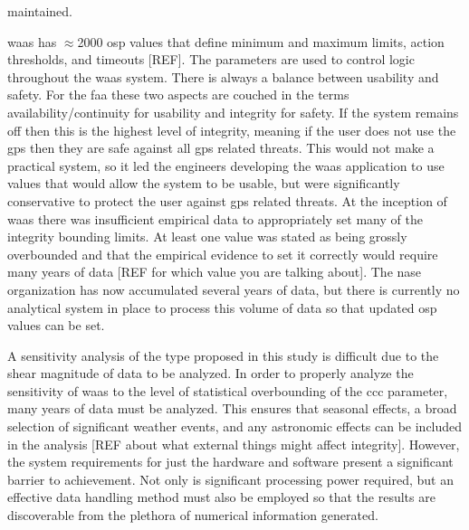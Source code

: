 maintained. %

\ac{waas} has $\approx$2000 \ac{osp} values that define minimum and maximum limits, action thresholds, and timeouts [REF]. The parameters are used to control logic throughout the \ac{waas} system. There is always a balance between usability and safety.  For the \ac{faa} these two aspects are couched in the terms availability/continuity for usability and integrity for safety.  If the system remains off then this is the highest level of integrity, meaning if the user does not use the \ac{gps} then they are safe against all \ac{gps} related threats.  This would not make a practical system, so it led the engineers developing the \ac{waas} application to use values that would allow the system to be usable, but were significantly conservative to protect the user against \ac{gps} related threats.  At the inception of \ac{waas} there was insufficient empirical data to appropriately set many of the integrity bounding limits.  At least one value was stated as being grossly overbounded and that the empirical evidence to set it correctly would require many years of data [REF for which value you are talking about].  The \ac{nase} organization has now accumulated several years of data, but there is currently no analytical system in place to process this volume of data so that updated \ac{osp} values can be set.

A sensitivity analysis of the type proposed in this study is difficult due to the shear magnitude of data to be analyzed. In order to properly analyze the sensitivity of \ac{waas} to the level of statistical overbounding of the \ac{ccc} parameter, many years of data must be analyzed.  This ensures that seasonal effects, a broad selection of significant weather events, and any astronomic effects can be included in the analysis [REF about what external things might affect integrity].  However, the system requirements for just the hardware and software present a significant barrier to achievement. Not only is significant processing power required, but an effective data handling method must also be employed so that the results are discoverable from the plethora of numerical information generated.  %
 
